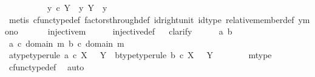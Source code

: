 \begin{isabellebody}
\ \ \isamarkupfalse%
\ \isanewline
\ \ \ \ \isamarkupfalse%
\ {\isachardoublequoteopen}y{}\ {\isasymin}\isactrlsub c\ Y\ {\isasymLongrightarrow}\ y{}\ {\isasymin}\isactrlbsub Y\isactrlesub \ {\isacharparenleft}{\kern0pt}{\isasymone}{\isacharcomma}{\kern0pt}\ y{}{\isacharparenright}{\kern0pt}{\isachardoublequoteclose}\isanewline
\ \ \ \ \ \ \isamarkupfalse%
\ {\isacharparenleft}{\kern0pt}metis\ cfunc{\isacharunderscore}{\kern0pt}type{\isacharunderscore}{\kern0pt}def\ factors{\isacharunderscore}{\kern0pt}through{\isacharunderscore}{\kern0pt}def\ id{\isacharunderscore}{\kern0pt}right{\isacharunderscore}{\kern0pt}unit{}\ id{\isacharunderscore}{\kern0pt}type\ relative{\isacharunderscore}{\kern0pt}member{\isacharunderscore}{\kern0pt}def{}\ y{}{\isacharunderscore}{\kern0pt}mono{\isacharparenright}{\kern0pt}\isanewline
\ \ \isamarkupfalse%
\isanewline
\isanewline
\isanewline
\ \ \isamarkupfalse%
\ {\isachardoublequoteopen}injective{\isacharparenleft}{\kern0pt}m{\isacharparenright}{\kern0pt}{\isachardoublequoteclose}\isanewline
\ \ \ \ \isamarkupfalse%
\ injective{\isacharunderscore}{\kern0pt}def\isanewline
\ \ \isamarkupfalse%
{\isacharparenleft}{\kern0pt}clarify{\isacharparenright}{\kern0pt}\isanewline
\ \ \ \ \isamarkupfalse%
\ a\ b\ \isanewline
\ \ \ \ \isamarkupfalse%
\ {\isachardoublequoteopen}a\ {\isasymin}\isactrlsub c\ domain\ m{\isachardoublequoteclose}\ {\isachardoublequoteopen}b\ {\isasymin}\isactrlsub c\ domain\ m{\isachardoublequoteclose}\isanewline
\ \ \ \ \isamarkupfalse%
\ \isamarkupfalse%
\ a{\isacharunderscore}{\kern0pt}type{\isacharbrackleft}{\kern0pt}type{\isacharunderscore}{\kern0pt}rule{\isacharbrackright}{\kern0pt}{\isacharcolon}{\kern0pt}\ {\isachardoublequoteopen}a\ {\isasymin}\isactrlsub c\ X\ \ {\isasymCoprod}\ Y{\isachardoublequoteclose}\ \ b{\isacharunderscore}{\kern0pt}type{\isacharbrackleft}{\kern0pt}type{\isacharunderscore}{\kern0pt}rule{\isacharbrackright}{\kern0pt}{\isacharcolon}{\kern0pt}\ {\isachardoublequoteopen}b\ {\isasymin}\isactrlsub c\ X\ \ {\isasymCoprod}\ Y{\isachardoublequoteclose}\isanewline
\ \ \ \ \ \ \isamarkupfalse%
\ m{\isacharunderscore}{\kern0pt}type\ \isamarkupfalse%
\ cfunc{\isacharunderscore}{\kern0pt}type{\isacharunderscore}{\kern0pt}def\ \isamarkupfalse%
\ auto\isanewline
\ \ \ \ \isamarkupfalse%

\end{isabellebody}
